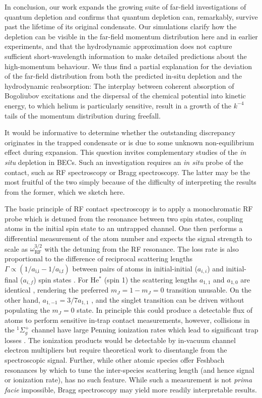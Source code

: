 	In conclusion, our work expands the growing suite of far-field investigations of quantum depletion \cite{Cayla20,Chang16} and confirms that quantum depletion can, remarkably, survive past the lifetime of its original condensate. 
	Our simulations clarify how the depletion can be visible in the far-field momentum distribution here and in earlier experiments, and that the hydrodynamic approximation does not capture sufficient short-wavelength information to make detailed predictions about the high-momentum behaviour. 
	We thus find a partial explanation for the deviation of the far-field distribution from both the predicted in-situ depletion and the hydrodynamic reabsorption: The interplay between coherent absorption of Bogoliubov excitations and the dispersal of the chemical potential into kinetic energy, to which helium is particularly sensitive, result in a growth of the $k^{-4}$ tails of the momentum distribution during freefall. 

	It would be informative to determine whether the outstanding discrepancy originates in the trapped condensate or is due to some unknown non-equilibrium effect during expansion.
	This question invites complementary studies of the \emph{in situ} depletion in \mhe BECs. 
	Such an investigation requires an \emph{in situ} probe of the contact, such as RF spectroscopy or Bragg spectroscopy.
	The latter may be the most fruitful of the two simply because of the difficulty of interpreting the results from the former, which we sketch here. 
	
	The basic principle of RF contact spectroscopy is to apply a monochromatic RF probe which is detuned from the resonance between two spin states, coupling atoms in the initial spin state to an untrapped channel. 
	One then performs a differential measurement of the atom number and expects the signal strength to scale as $\omega_\textrm{RF}^{3/2}$ with the detuning from the RF resonance.
	The loss rate is also proportional to the difference of reciprocal scattering lengths $\Gamma\propto(1/a_\textrm{i,i}-1/a_\textrm{i,f})$ between pairs of atoms in initial-initial ($a_{i,i}$) and initial-final ($a_{i,f}$) spin states \cite{Braaten10,Wild12}. 
	For He$^*$ (spin 1) the scattering lengths $a_{1,1}$ and $a_{1,0}$ are identical \cite{Leo01}, rendering the preferred $m_J=1-m_J=0$ transition unusable. 
	On the other hand, $a_{1,-1} = 3/7 a_{1,1}$ \cite{Vassen16}, and the singlet transition can be driven without populating the $m_J=0$ state. 
	In principle this could produce a detectable flux of atoms to perform sensitive in-trap contact measurements, however, collisions in the $^1\Sigma_{g}^{+}$ channel have large Penning ionization rates which lead to significant trap losses \cite{Leo01}. 
	The ionization products would be detectable by in-vacuum channel electron multipliers but require theoretical work to disentangle from the spectroscopic signal. 
	Further, while other atomic species offer Feshbach resonances by which to tune the inter-species scattering length (and hence signal or ionization rate), \mhe has no such feature. 
	While such a measurement is not \emph{prima facie} impossible, Bragg spectroscopy may yield more readily interpretable results.



